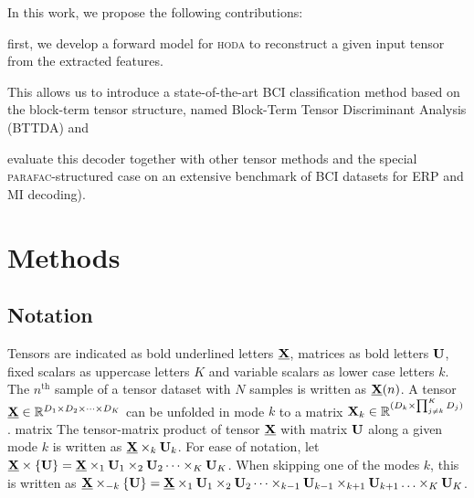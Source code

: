 \documentclass[twocolumn]{article}
\begin{document}

In this work, we propose the following contributions:
\begin{enumerate*}[label={\arabic*)}]
  \item first, we develop a forward model for \textsc{hoda} to reconstruct a
    given input tensor from the extracted features.
  \item This allows us to introduce a state-of-the-art BCI classification method based on the
    block-term tensor structure, named Block-Term Tensor Discriminant Analysis
    (\textsc{BTTDA}) and
  \item evaluate this decoder together with other tensor methods and the
    special \textsc{parafac}-structured case on an extensive benchmark of BCI
    datasets for ERP and MI decoding).
\end{enumerate*}

\section{Methods}

\subsection{Notation}
Tensors are indicated as bold underlined letters $\ten{X}$, matrices as bold
letters $\mat{U}$, fixed scalars as uppercase letters $K$ and variable
scalars as lower case letters $k$.
The $n^\text{th}$ sample of a tensor dataset with $N$ samples is written as
$\ten{X}(n)$.
A tensor $\ten{X}\in \mathbb{R}^{D_1\times D_2 \times \cdots \times D_K}$ can be unfolded in mode
$k$ to a matrix $\mat{X}_k\in\mathbb{R}^{(D_k\times\prod_{j\neq k}^K D_j)}$.
matrix
The tensor-matrix product of tensor $\ten{X}$ with matrix $\mat{U}$ along a
given mode $k$ is written as $\ten{X}\mpr{\mat{U}}{k}$. For ease of notation, let
$\ten{X}\mmpr{\mat{U}} =
	\ten{X}\mpr{\mat{U}}{1}\mpr{\mat{U}}{2}\cdots\mpr{\mat{U}}{K}$.
When skipping one of the modes $k$, this is
written as $\ten{X}\mmprs{\mat{U}}{k} =
	\ten{X}\mpr{\mat{U}}{1}\mpr{\mat{U}}{2}\cdots\mpr{\mat{U}}{k-1}\mpr{\mat{U}}{k+1}\ldots\mpr{\mat{U}}{K}$.
\end{document}

